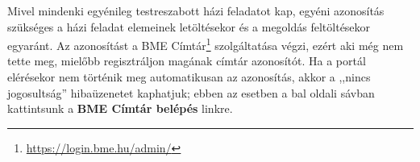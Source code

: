 Mivel mindenki egyénileg testreszabott házi feladatot kap, egyéni azonosítás szükséges a házi feladat elemeinek letöltésekor és a megoldás feltöltésekor egyaránt. Az azonosítást a BME Címtár\footnote{\url{https://login.bme.hu/admin/}} szolgáltatása végzi, ezért aki még nem tette meg, mielőbb regisztráljon magának címtár azonosítót. Ha a portál elérésekor nem történik meg automatikusan az azonosítás, akkor a ,,nincs jogosultság'' hibaüzenetet kaphatjuk; ebben az esetben a bal oldali sávban kattintsunk a \textbf{BME Címtár belépés} linkre.
